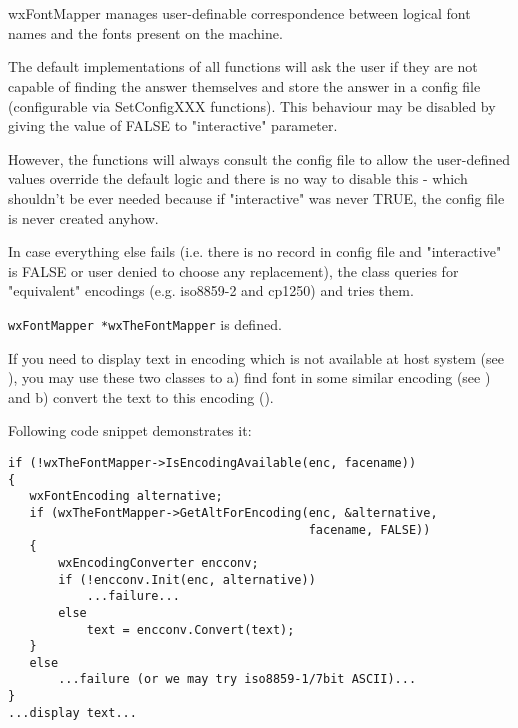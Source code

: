 %
%

\section{}\label{wxfontmapper}

wxFontMapper manages user-definable correspondence between logical font
names and the fonts present on the machine.

The default implementations of all functions will ask the user if they are
not capable of finding the answer themselves and store the answer in a
config file (configurable via SetConfigXXX functions). This behaviour may
be disabled by giving the value of FALSE to "interactive" parameter.

However, the functions will always consult the config file to allow the
user-defined values override the default logic and there is no way to
disable this - which shouldn't be ever needed because if "interactive" was
never TRUE, the config file is never created anyhow.

In case everything else fails (i.e. there is no record in config file
and "interactive" is FALSE or user denied to choose any replacement), 
the class queries  
for "equivalent" encodings (e.g. iso8859-2 and cp1250) and tries them.


{\tt wxFontMapper *wxTheFontMapper} is defined.


If you need to display text in encoding which is not available at
host system (see ),
you may use these two classes to a) find font in some similar encoding
(see )
and
b) convert the text to this encoding 
().

Following code snippet demonstrates it:

\begin{verbatim}
if (!wxTheFontMapper->IsEncodingAvailable(enc, facename))
{
   wxFontEncoding alternative;
   if (wxTheFontMapper->GetAltForEncoding(enc, &alternative,
                                          facename, FALSE))
   {
       wxEncodingConverter encconv;
       if (!encconv.Init(enc, alternative))
           ...failure...
       else
           text = encconv.Convert(text);
   }
   else
       ...failure (or we may try iso8859-1/7bit ASCII)...
}
...display text...
\end{verbatim}


